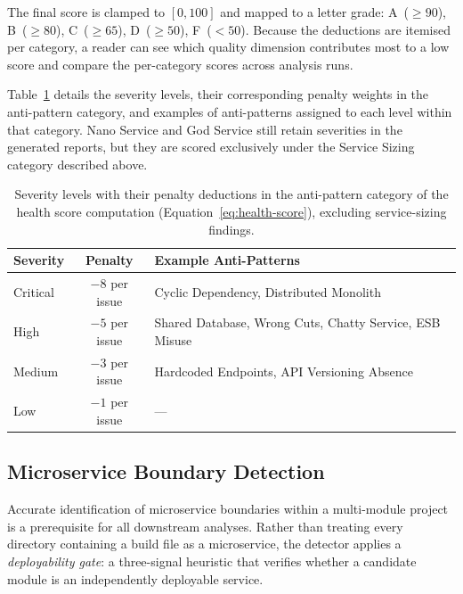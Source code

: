 \par The final score is clamped to $[0, 100]$ and mapped to a letter grade: A~($\geq 90$), B~($\geq 80$), C~($\geq 65$), D~($\geq 50$), F~($< 50$). Because the deductions are itemised per category, a reader can see which quality dimension contributes most to a low score and compare the per-category scores across analysis runs.

Table~\ref{tab:severity-weights} details the severity levels, their corresponding penalty weights in the anti-pattern category, and examples of anti-patterns assigned to each level within that category. Nano Service and God Service still retain severities in the generated reports, but they are scored exclusively under the Service Sizing category described above.

\begin{table}[htbp]
    \centering
    \footnotesize
    \begin{tabular}{|l|c|p{6.5cm}|}
        \hline
        \textbf{Severity} & \textbf{Penalty} & \textbf{Example Anti-Patterns} \\
        \hline\hline
        Critical & $-8$ per issue & Cyclic Dependency, Distributed Monolith \\
        \hline
        High & $-5$ per issue & Shared Database, Wrong Cuts, Chatty Service, ESB Misuse \\
        \hline
        Medium & $-3$ per issue & Hardcoded Endpoints, API Versioning Absence \\
        \hline
        Low & $-1$ per issue & --- \\
        \hline
    \end{tabular}
    \caption{Severity levels with their penalty deductions in the anti-pattern category of the health score computation (Equation~\ref{eq:health-score}), excluding service-sizing findings.}
    \label{tab:severity-weights}
\end{table}

\subsection{Microservice Boundary Detection}
\label{subsec:microservice-detection}

\par Accurate identification of microservice boundaries within a multi-module project is a prerequisite for all downstream analyses. Rather than treating every directory containing a build file as a microservice, the detector applies a \textit{deployability gate}: a three-signal heuristic that verifies whether a candidate module is an independently deployable service.

